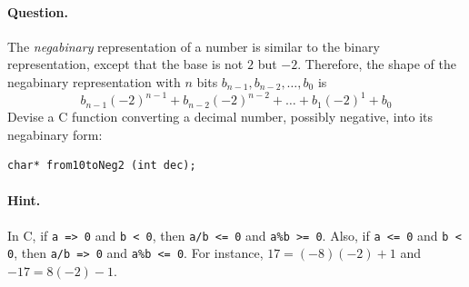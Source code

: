 \paragraph{Question.} The \emph{negabinary} representation of a number
is similar to the binary representation, except that the base is not
\(2\) but \(-2\). Therefore, the shape of the negabinary
representation with \(n\) bits \(b_{n-1}, b_{n-2}, \dots, b_0\) is
\[
b_{n-1}(-2)^{n-1} + b_{n-2}(-2)^{n-2} + \dots + b_1(-2)^1 + b_0
\]
Devise a \textsf{C} function converting a decimal number, possibly
negative, into its negabinary form:
{\small
\begin{verbatim}
char* from10toNeg2 (int dec);
\end{verbatim}
}

\paragraph{Hint.} In \textsf{C}, if \texttt{a => 0} and \texttt{b < 0},
then \texttt{a/b <= 0} and \texttt{a\%b >= 0}. Also, if \texttt{a <=
0} and \texttt{b < 0}, then \texttt{a/b => 0} and \texttt{a\%b <=
0}. For instance, \(17 = (-8)(-2) + 1\) and \(-17 = 8(-2) - 1\).

